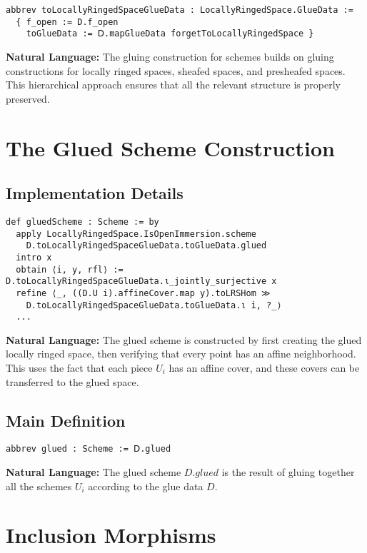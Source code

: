 \documentclass{article}
\theoremstyle{definition}
\begin{document}
\begin{lstlisting}
abbrev toLocallyRingedSpaceGlueData : LocallyRingedSpace.GlueData :=
  { f_open := D.f_open
    toGlueData := 𝖣.mapGlueData forgetToLocallyRingedSpace }
\end{lstlisting}

\textbf{Natural Language:} The gluing construction for schemes builds on gluing constructions for locally ringed spaces, sheafed spaces, and presheafed spaces. This hierarchical approach ensures that all the relevant structure is properly preserved.

\section{The Glued Scheme Construction}

\subsection{Implementation Details}

\begin{lstlisting}
def gluedScheme : Scheme := by
  apply LocallyRingedSpace.IsOpenImmersion.scheme
    D.toLocallyRingedSpaceGlueData.toGlueData.glued
  intro x
  obtain ⟨i, y, rfl⟩ := D.toLocallyRingedSpaceGlueData.ι_jointly_surjective x
  refine ⟨_, ((D.U i).affineCover.map y).toLRSHom ≫
    D.toLocallyRingedSpaceGlueData.toGlueData.ι i, ?_⟩
  ...
\end{lstlisting}

\textbf{Natural Language:} The glued scheme is constructed by first creating the glued locally ringed space, then verifying that every point has an affine neighborhood. This uses the fact that each piece $U_i$ has an affine cover, and these covers can be transferred to the glued space.

\subsection{Main Definition}

\begin{lstlisting}
abbrev glued : Scheme := 𝖣.glued
\end{lstlisting}

\textbf{Natural Language:} The glued scheme $D.glued$ is the result of gluing together all the schemes $U_i$ according to the glue data $D$.

\section{Inclusion Morphisms}
\end{document}
